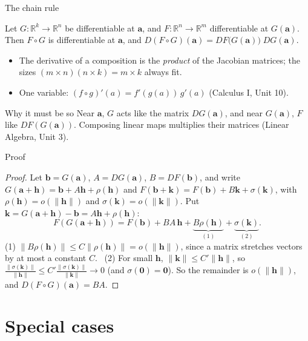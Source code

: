 \documentclass[10pt]{wosm-slides}
\newcommand{\R}{\mathbb{R}}
\newcommand{\norm}[1]{\lVert #1 \rVert}
\newcommand{\va}{\mathbf{a}}
\newcommand{\vb}{\mathbf{b}}
\newcommand{\vh}{\mathbf{h}}
\newcommand{\vk}{\mathbf{k}}
\begin{document}
\begin{frame}{The chain rule}
  \begin{theorem}
    Let $G\colon \R^k \to \R^n$ be differentiable at $\va$, and $F\colon \R^n \to \R^m$ differentiable
    at $G(\va)$. Then $F \circ G$ is differentiable at $\va$, and
    $D(F \circ G)(\va) = DF\bigl(G(\va)\bigr)\; DG(\va)$.
  \end{theorem}
  \begin{itemize}
    \item The derivative of a composition is the \emph{product} of the Jacobian matrices;
      the sizes $(m \times n)(n \times k) = m \times k$ always fit.
    \item One variable: $(f \circ g)'(a) = f'(g(a))\, g'(a)$ (Calculus I, Unit 10).
  \end{itemize}
  \pause
  \begin{block}{Why it must be so}
    Near $\va$, $G$ acts like the matrix $DG(\va)$, and near $G(\va)$, $F$ like $DF(G(\va))$.
    Composing linear maps multiplies their matrices (Linear Algebra, Unit 3).
  \end{block}
\end{frame}

\begin{frame}{Proof}
  \begin{proof}
    Let $\vb = G(\va)$, $A = DG(\va)$, $B = DF(\vb)$, and write
    $G(\va + \vh) = \vb + A\vh + \rho(\vh)$ and $F(\vb + \vk) = F(\vb) + B\vk + \sigma(\vk)$, with
    $\rho(\vh) = o(\norm{\vh})$ and $\sigma(\vk) = o(\norm{\vk})$. Put $\vk = G(\va + \vh) - \vb = A\vh + \rho(\vh)$:
    \[ F(G(\va + \vh)) = F(\vb) + BA\,\vh + \underbrace{B\rho(\vh)}_{(1)} + \underbrace{\sigma(\vk)}_{(2)} . \]
    (1) $\norm{B\rho(\vh)} \le C\norm{\rho(\vh)} = o(\norm{\vh})$, since a matrix stretches vectors by at
    most a constant $C$.
    \ (2) For small $\vh$, $\norm{\vk} \le C'\norm{\vh}$, so
    $\frac{\norm{\sigma(\vk)}}{\norm{\vh}} \le C' \frac{\norm{\sigma(\vk)}}{\norm{\vk}} \to 0$ (and $\sigma(\mathbf 0) = \mathbf 0$).
    So the remainder is $o(\norm{\vh})$, and $D(F \circ G)(\va) = BA$.
  \end{proof}
\end{frame}

\section{Special cases}
\end{document}
